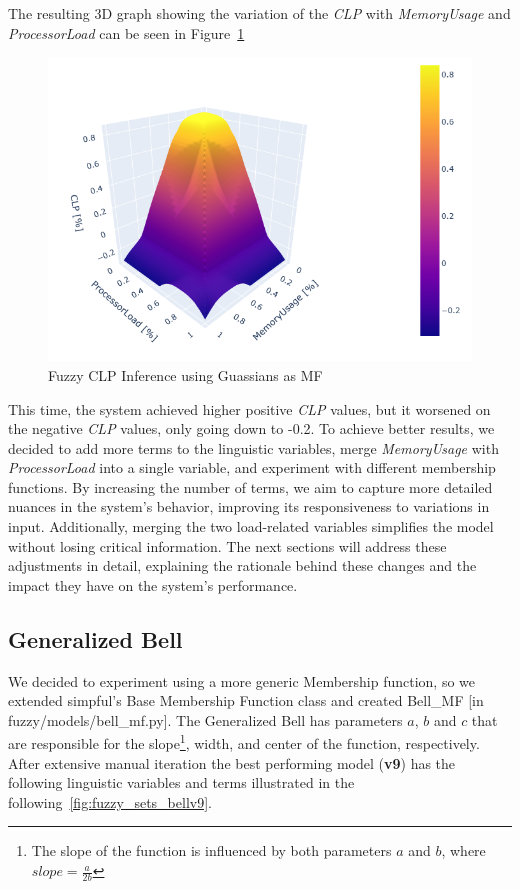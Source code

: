 \documentclass[titlepage]{article}
\begin{document}
\vspace{10mm}

The resulting 3D graph showing the variation of the \textit{CLP} with \textit{MemoryUsage} and \textit{ProcessorLoad} can be seen in Figure~\ref{fig:3d_gaussian}

\begin{figure}[H]
    \centering
\includegraphics[scale = 0.7]{../images/3d_guassian}
\caption{Fuzzy CLP Inference using Guassians as MF}
\label{fig:3d_gaussian}
\end{figure}

\vspace{10mm}


This time, the system achieved higher positive \textit{CLP} values, but it worsened on the negative \textit{CLP} values, only going down to -0.2.
To achieve better results, we decided to add more terms to the linguistic variables, merge \textit{MemoryUsage} with \textit{ProcessorLoad} into a single variable, and experiment with different membership functions. By increasing the number of terms, we aim to capture more detailed nuances in the system's behavior, improving its responsiveness to variations in input. Additionally, merging the two load-related variables simplifies the model without losing critical information. The next sections will address these adjustments in detail, explaining the rationale behind these changes and the impact they have on the system's performance.


\subsection{Generalized Bell}
We decided to experiment using a more generic Membership function, so we
extended simpful's Base Membership Function class and created Bell\_MF [in fuzzy/models/bell\_mf.py].
The Generalized Bell has parameters $a$, $b$ and $c$ that are responsible for the slope\footnote[1]{The slope of the function is influenced by both parameters $a$ and $b$, where $slope = \frac{a}{2b}$}, width, and center of the function, respectively.
After extensive manual iteration the best performing model (\textbf{v9}) has the following linguistic variables and terms illustrated in the following~\cref{fig:fuzzy_sets_bellv9}.
\end{document}
